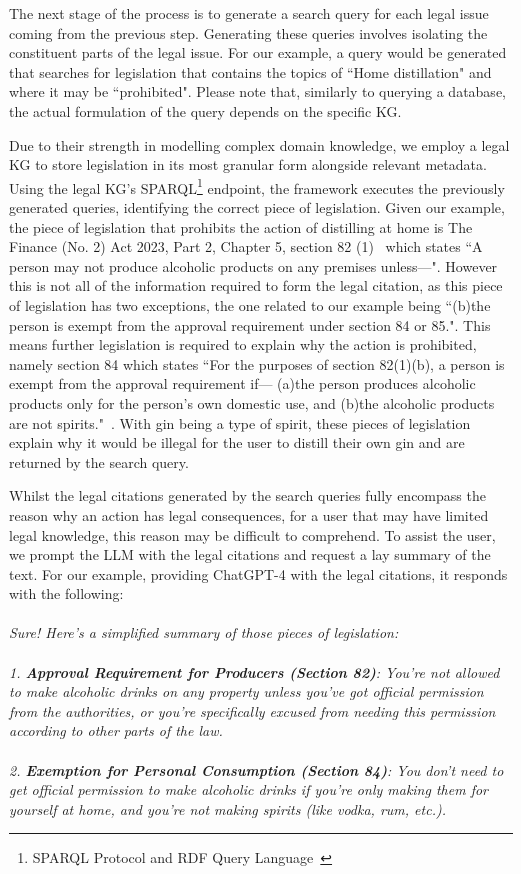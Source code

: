 \documentclass[sn-mathphys-num]{sn-jnl}%
\begin{document}
The next stage of the process is to generate a search query for each legal issue coming from the previous step. Generating these queries involves isolating the constituent parts of the legal issue. For our example, a query would be generated that searches for legislation that contains the topics of ``Home distillation" and where it may be ``prohibited". Please note that, similarly to querying a database, the actual formulation of the query depends on the specific KG.

Due to their strength in modelling complex domain knowledge, we employ a legal KG to store legislation in its most granular form alongside relevant metadata. Using the legal KG's SPARQL\footnote{SPARQL Protocol and RDF Query Language~\cite{world2013sparql}} endpoint, the framework executes the previously generated queries, identifying the correct piece of legislation. Given our example, the piece of legislation that prohibits the action of distilling at home is The Finance (No. 2) Act 2023, Part 2, Chapter 5, section 82 (1)~\cite{uk2023c30p2c5s82} which states ``A person may not produce alcoholic products on any premises unless—". However this is not all of the information required to form the legal citation, as this piece of legislation has two exceptions, the one related to our example being ``(b)the person is exempt from the approval requirement under section 84 or 85.". This means further legislation is required to explain why the action is prohibited, namely section 84 which states ``For the purposes of section 82(1)(b), a person is exempt from the approval requirement if— (a)the person produces alcoholic products only for the person’s own domestic use, and (b)the alcoholic products are not spirits."~\cite{uk2023c30p2c5s82}. With gin being a type of spirit, these pieces of legislation explain why it would be illegal for the user to distill their own gin and are returned by the search query.

Whilst the legal citations generated by the search queries fully encompass the reason why an action has legal consequences, for a user that may have limited legal knowledge, this reason may be difficult to comprehend. To assist the user, we prompt the LLM with the legal citations and request a lay summary of the text. For our example, providing ChatGPT-4 with the legal citations, it responds with the following: 
\\
\\
\textit{Sure! Here's a simplified summary of those pieces of legislation:}
\\
\\
\textit{1. \textbf{Approval Requirement for Producers (Section 82)}: You're not allowed to make alcoholic drinks on any property unless you've got official permission from the authorities, or you're specifically excused from needing this permission according to other parts of the law.}
\\
\\
\textit{2. \textbf{Exemption for Personal Consumption (Section 84)}: You don't need to get official permission to make alcoholic drinks if you're only making them for yourself at home, and you're not making spirits (like vodka, rum, etc.).}
\\
\end{document}
